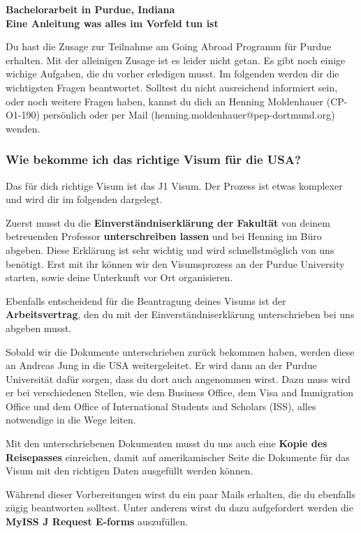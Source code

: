 \documentclass[
  paper=a4,
  fontsize=12pt,
  DIV=16,
  headheight=52pt,
  footheight=45pt,
  headinclude,
  parskip=full,
]{scrartcl}
\date{31. Juli 2014}
\begin{document}
\textbf{\Huge\sffamily Bachelorarbeit in Purdue, Indiana}\\[0.5\baselineskip]
\textbf{\Large\sffamily Eine Anleitung was alles im Vorfeld tun ist}

Du hast die Zusage zur Teilnahme am Going Abroad Programm für Purdue erhalten.
Mit der alleinigen Zusage ist es leider nicht getan.
Es gibt noch einige wichige Aufgaben, die du vorher erledigen musst.
Im folgenden werden dir die wichtigsten Fragen beantwortet.
Solltest du nicht ausreichend informiert sein, oder noch weitere Fragen haben,
kannst du dich an Henning Moldenhauer (CP-O1-190) persönlich oder per Mail
(henning.moldenhauer@pep-dortmund.org) wenden.

\subsubsection*{Wie bekomme ich das richtige Visum für die USA?}
Das für dich richtige Visum ist das J1 Visum.
Der Prozess ist etwas komplexer und wird dir im folgenden dargelegt.

Zuerst musst du die \textbf{Einverständniserklärung der Fakultät} von deinem
betreuenden Professor \textbf{unterschreiben lassen} und bei Henning im Büro
abgeben.
Diese Erklärung ist sehr wichtig und wird schnellstmöglich von uns benötigt.
Erst mit ihr können wir den Visumsprozess an der Purdue University starten, sowie
deine Unterkunft vor Ort organisieren.

Ebenfalls entscheidend für die Beantragung deines Visums ist der
\textbf{Arbeitsvertrag}, den du mit der Einverständniserklärung unterschrieben
bei uns abgeben musst.

Sobald wir die Dokumente unterschrieben zurück bekommen haben, werden diese an
Andreas Jung in die USA weitergeleitet.
Er wird dann an der Purdue Universität dafür sorgen, dass du dort auch angenommen
wirst. Dazu muss wird er bei verschiedenen Stellen, wie dem Business Office,
dem Visa and Immigration Office und dem Office of International Students and
Scholars (ISS), alles notwendige in die Wege leiten.

Mit den unterschriebenen Dokumenten musst du uns auch eine
\textbf{Kopie des Reisepasses} einreichen, damit auf amerikamischer Seite die
Dokumente für das Visum mit den richtigen Daten ausgefüllt werden können.

Während dieser Vorbereitungen wirst du ein paar Mails erhalten, die du
ebenfalls zügig beantworten solltest.
Unter anderem wirst du dazu aufgefordert werden die
\textbf{MyISS J Request E-forms} auszufüllen.
\end{document}
